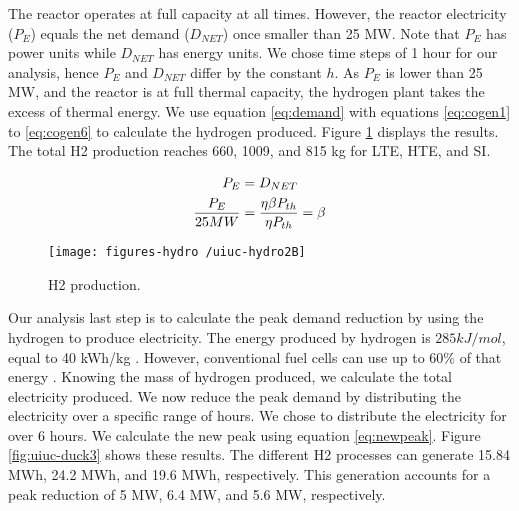 \documentclass[11pt,letterpaper]{article}
\begin{document}
The reactor operates at full capacity at all times.
However, the reactor electricity ($P_{E}$) equals the net demand ($D_{NET}$) once smaller than 25 MW.
Note that $P_{E}$ has power units while $D_{NET}$ has energy units.
We chose time steps of 1 hour for our analysis, hence $P_{E}$ and $D_{NET}$ differ by the constant $h$.
As $P_{E}$ is lower than 25 MW, and the reactor is at full thermal capacity, the hydrogen plant takes the excess of thermal energy.
We use equation \ref{eq:demand} with equations \ref{eq:cogen1} to \ref{eq:cogen6} to calculate the hydrogen produced.
Figure \ref{fig:uiuc-duck2} displays the results.
The total \gls{H2} production reaches 660, 1009, and 815 kg for \gls{LTE}, \gls{HTE}, and \gls{SI}.

\begin{align}
	P_{E} &= D_{NET}  \notag \\
  \frac{P_{E}}{25 MW} &= \frac{\eta \beta P_{th}}{\eta P_{th}} = \beta  \label{eq:demand}
\end{align}


\begin{figure}[htbp!]
		\centering
	\texttt{[image: figures-hydro /uiuc-hydro2B]}
	\hfill
	\caption{\gls{H2} production.}
	\label{fig:uiuc-duck2}
\end{figure}

Our analysis last step is to calculate the peak demand reduction by using the hydrogen to produce electricity.
The energy produced by hydrogen is $285 kJ/mol$, equal to 40 kWh/kg \cite{ursua_hydrogen_2012}.
However, conventional fuel cells can use up to 60$\%$ of that energy \cite{doe_energy_efficiency_and_renewable_energy_fuel_2015}.
Knowing the mass of hydrogen produced, we calculate the total electricity produced.
We now reduce the peak demand by distributing the electricity over a specific range of hours.
We chose to distribute the electricity for over 6 hours.
We calculate the new peak using equation \ref{eq:newpeak}.
Figure \ref{fig:uiuc-duck3} shows these results.
The different \gls{H2} processes can generate 15.84 MWh, 24.2 MWh, and 19.6 MWh, respectively.
This generation accounts for a peak reduction of 5 MW, 6.4 MW, and 5.6 MW, respectively.
\end{document}
